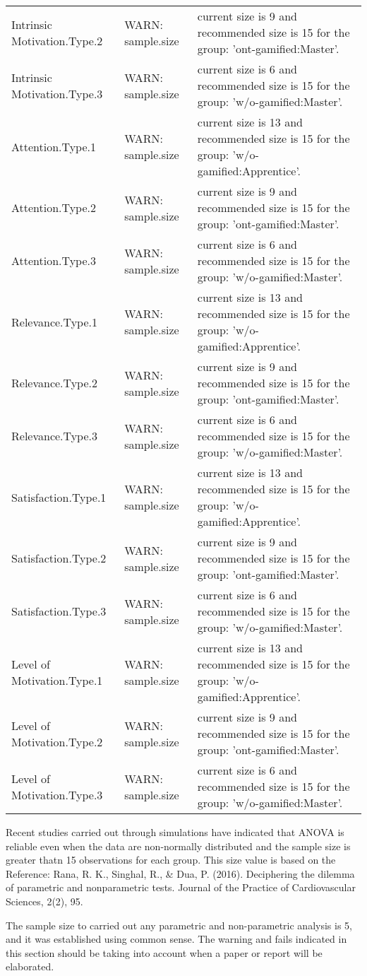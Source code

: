\documentclass[6pt,a4paper]{article}
\begin{document}
{\begin{longtable}{lll}
Intrinsic Motivation.Type.2&WARN: sample.size&current size is 9 and recommended size is 15 for the group: 'ont-gamified:Master'.\tabularnewline
Intrinsic Motivation.Type.3&WARN: sample.size&current size is 6 and recommended size is 15 for the group: 'w/o-gamified:Master'.\tabularnewline
Attention.Type.1&WARN: sample.size&current size is 13 and recommended size is 15 for the group: 'w/o-gamified:Apprentice'.\tabularnewline
Attention.Type.2&WARN: sample.size&current size is 9 and recommended size is 15 for the group: 'ont-gamified:Master'.\tabularnewline
Attention.Type.3&WARN: sample.size&current size is 6 and recommended size is 15 for the group: 'w/o-gamified:Master'.\tabularnewline
Relevance.Type.1&WARN: sample.size&current size is 13 and recommended size is 15 for the group: 'w/o-gamified:Apprentice'.\tabularnewline
Relevance.Type.2&WARN: sample.size&current size is 9 and recommended size is 15 for the group: 'ont-gamified:Master'.\tabularnewline
Relevance.Type.3&WARN: sample.size&current size is 6 and recommended size is 15 for the group: 'w/o-gamified:Master'.\tabularnewline
Satisfaction.Type.1&WARN: sample.size&current size is 13 and recommended size is 15 for the group: 'w/o-gamified:Apprentice'.\tabularnewline
Satisfaction.Type.2&WARN: sample.size&current size is 9 and recommended size is 15 for the group: 'ont-gamified:Master'.\tabularnewline
Satisfaction.Type.3&WARN: sample.size&current size is 6 and recommended size is 15 for the group: 'w/o-gamified:Master'.\tabularnewline
Level of Motivation.Type.1&WARN: sample.size&current size is 13 and recommended size is 15 for the group: 'w/o-gamified:Apprentice'.\tabularnewline
Level of Motivation.Type.2&WARN: sample.size&current size is 9 and recommended size is 15 for the group: 'ont-gamified:Master'.\tabularnewline
Level of Motivation.Type.3&WARN: sample.size&current size is 6 and recommended size is 15 for the group: 'w/o-gamified:Master'.\tabularnewline
\hline
\end{longtable}}

Recent studies carried out through simulations have indicated that ANOVA is reliable even when the data are non-normally distributed and the sample size is greater thatn 15 observations for each group.
This size value is based on the Reference:
Rana, R. K., Singhal, R., \& Dua, P. (2016). Deciphering the dilemma of parametric and nonparametric tests. Journal of the Practice of Cardiovascular Sciences, 2(2), 95.

The sample size to carried out any parametric and non-parametric analysis is 5, and it was established using common sense.
The warning and fails indicated in this section should be taking into account when a paper or report will be elaborated.
\end{document}
